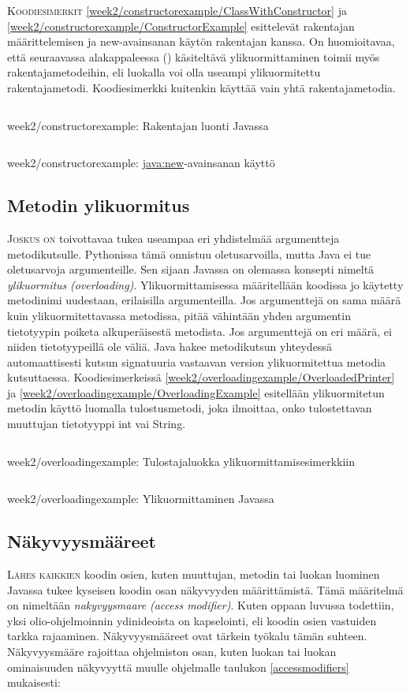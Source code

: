 \documentclass[openany]{book}
\newcommand{\newthought}[1]{\smallskip\textsc{#1}}
\newcommand{\eng}[1]{\textit{(#1)}}
\newcommand{\new}[1]{\textit{\gls{#1}}}
\newcommand{\neweng}[2]{\new{#1} \eng{#2}}
\newcommand{\java}[1]{\underline{\gls{java:#1}}}
\newcommand{\code}[3]{
	\begin{listing}
		\linespread{0.85}
		\inputminted{java}{OhjelmointiopasEsimerkit/src/#1/#2.java}
		\caption{#1: #3}
		\label{#1/#2}
	\end{listing}
}
\begin{document}
\newthought{Koodiesimerkit} \ref{week2/constructorexample/ClassWithConstructor} ja
\ref{week2/constructorexample/ConstructorExample} esittelevät rakentajan määrittelemisen ja
new-avainsanan käytön rakentajan kanssa. On huomioitavaa, että seuraavassa alakappaleessa
() käsiteltävä ylikuormittaminen toimii myös rakentajametodeihin, eli
luokalla voi olla useampi ylikuormitettu rakentajametodi. Koodiesimerkki kuitenkin käyttää vain
yhtä rakentajametodia.

\code{week2/constructorexample}{ClassWithConstructor}{Rakentajan luonti Javassa}
\code{week2/constructorexample}{ConstructorExample}{\java{new}-avainsanan käyttö}


\subsection{Metodin ylikuormitus}
\label{overloading}

\newthought{Joskus on} toivottavaa tukea useampaa eri yhdistelmää argumentteja metodikutsulle.
Pythonissa tämä onnistuu oletusarvoilla, mutta Java ei tue oletusarvoja argumenteille. Sen
sijaan Javassa on olemassa konsepti nimeltä \neweng{ylikuormitus}{overloading}.
Ylikuormittamisessa määritellään koodissa jo käytetty metodinimi uudestaan, erilaisilla
argumenteilla. Jos argumenttejä on sama määrä kuin ylikuormitettavassa metodissa, pitää vähintään
yhden argumentin tietotyypin poiketa alkuperäisestä metodista. Jos argumenttejä on eri määrä, ei
niiden tietotyypeillä ole väliä. Java hakee metodikutsun yhteydessä automaattisesti kutsun
signatuuria vastaavan version ylikuormitettua metodia kutsuttaessa. Koodiesimerkeissä
\ref{week2/overloadingexample/OverloadedPrinter} ja
\ref{week2/overloadingexample/OverloadingExample} esitellään ylikuormitetun metodin käyttö
luomalla tulostusmetodi, joka ilmoittaa, onko tulostettavan muuttujan tietotyyppi int vai String.

\code{week2/overloadingexample}{OverloadedPrinter}{Tulostajaluokka ylikuormittamisesimerkkiin}
\code{week2/overloadingexample}{OverloadingExample}{Ylikuormittaminen Javassa}

\subsection{Näkyvyysmääreet}
\label{näkyvyysmääreet}

\newthought{Lähes kaikkien} koodin osien, kuten muuttujan, metodin tai luokan luominen Javassa
tukee kyseisen koodin osan näkyvyyden määrittämistä. Tämä määritelmä on nimeltään
\neweng{nakyvyysmaare}{access modifier}. Kuten oppaan luvussa  todettiin,
yksi olio-ohjelmoinnin ydinideoista on \gls{kapselointi}, eli koodin osien vastuiden tarkka
rajaaminen. Näkyvyysmääreet ovat tärkein työkalu tämän suhteen. Näkyvyysmääre rajoittaa
ohjelmiston osan, kuten luokan tai luokan ominaisuuden näkyvyyttä muulle ohjelmalle taulukon
\ref{accessmodifiers} mukaisesti:
\end{document}
